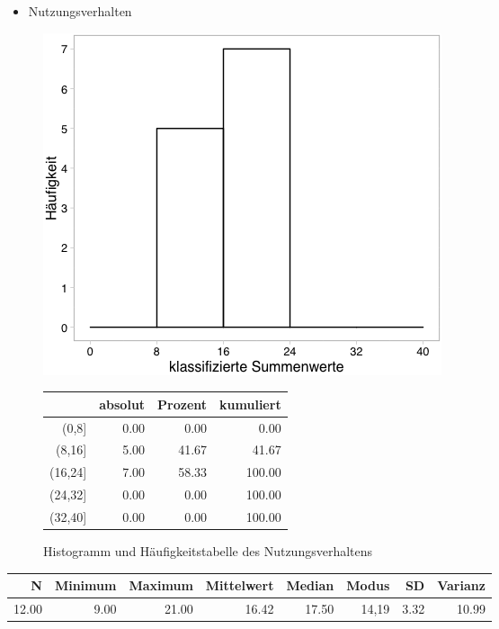 \documentclass[12pt, bibliography=totoc]{scrartcl}
\begin{document}
\begin{itemize}
\tightlist
\item
  Nutzungsverhalten
\end{itemize}

\begin{figure}[H]
\begin{minipage}{.5\linewidth}
\includegraphics[width=0.8\linewidth]{Anhang/NVHistnn.png}

\label{pic:aufbau}
\end{minipage}
\begin{minipage}{.5\linewidth}
\centering
\raisebox{\depth}
{\begin{tabular}{rrrr}
  \hline
 & absolut & Prozent & kumuliert \\ 
  \hline
(0,8] & 0.00 & 0.00 & 0.00 \\ 
  (8,16] & 5.00 & 41.67 & 41.67 \\ 
  (16,24] & 7.00 & 58.33 & 100.00 \\ 
  (24,32] & 0.00 & 0.00 & 100.00 \\ 
  (32,40] & 0.00 & 0.00 & 100.00 \\ 
   \hline
\end{tabular}

}
\label{tab:defis}
\end{minipage}
\caption{Histogramm und Häufigkeitstabelle des Nutzungsverhaltens}
\end{figure}

\begin{table}[H]
\centering
\begin{tabular}{rrrrrrrr}
  \hline
  N & Minimum & Maximum & Mittelwert & Median & Modus & SD & Varianz \\
  \hline
 12.00 & 9.00 & 21.00 & 16.42 & 17.50 & 14,19 & 3.32 & 10.99 \\     
   \hline
\end{tabular}
\end{table}
\end{document}
